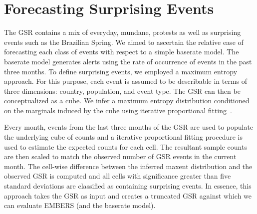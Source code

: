 \section{Forecasting Surprising Events}
\label{sec:suprising}
The GSR contains a mix of everyday, mundane, protests as well as surprising events such as the Brazilian Spring.
We aimed to ascertain the relative ease of forecasting each class of events
with respect to a simple baserate model.
The baserate model generates alerts using the rate of occurrence of events in the past three months.
To define surprising events,
we employed a maximum entropy approach. For this purpose, each event is assumed
to be describable
in terms of three dimensions: country, population, and event type. The GSR can then be conceptualized
as a cube. We infer a maximum entropy distribution conditioned on the marginals
induced by the cube using iterative proportional fitting~\cite{bishop2007discrete}.

%
%

Every month, events from the last three months of the
GSR are used to populate the underlying cube of counts and a iterative
proportional fitting procedure is %
used to estimate the expected counts
for each cell. The resultant sample counts are then scaled to
match the observed number of GSR events in the current month. The cell-wise difference between the inferred
maxent distribution and the observed GSR is computed and all cells with significance greater than five standard
deviations are classified as containing surprising events. In essence, this approach takes the GSR as input and
creates a truncated GSR against which we can evaluate EMBERS (and the baserate model).


